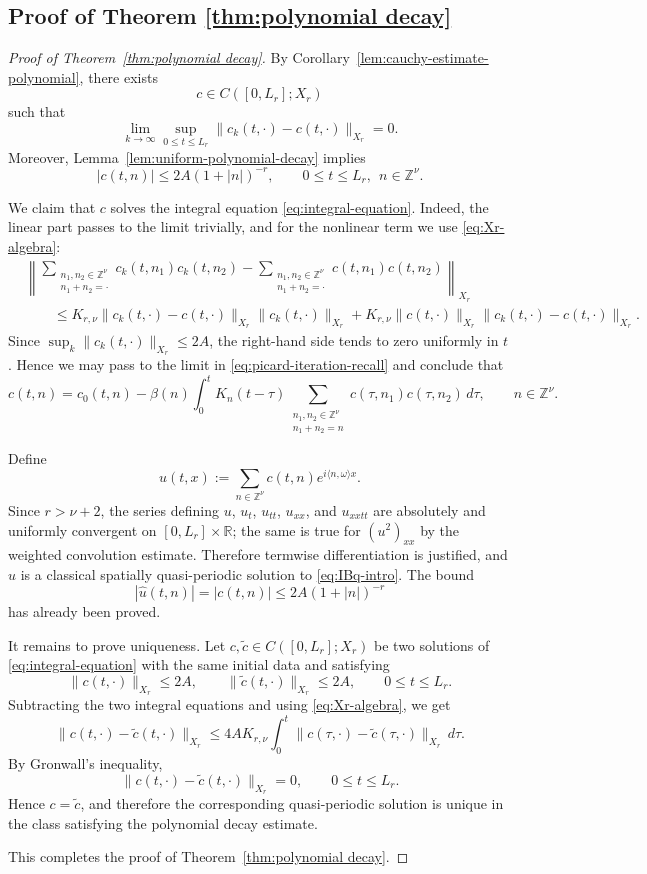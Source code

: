 \documentclass[12pt,reqno,tbtags]{amsart}
\newcommand\1{\mathbbm{1}}
\begin{document}
\subsection{Proof of Theorem \ref{thm:polynomial decay}}

\begin{proof}[Proof of Theorem~\ref{thm:polynomial decay}]
By Corollary~\ref{lem:cauchy-estimate-polynomial}, there exists
\[
c\in C([0,L_r];X_r)
\]
such that
\[
\lim_{k\to\infty}\sup_{0\le t\le L_r}\|c_k(t,\cdot)-c(t,\cdot)\|_{X_r}=0.
\]
Moreover, Lemma~\ref{lem:uniform-polynomial-decay} implies
\[
|c(t,n)|\le 2A(1+|n|)^{-r},
\qquad
0\le t\le L_r,\ \ n\in\mathbb Z^\nu.
\]

We claim that $c$ solves the integral equation \eqref{eq:integral-equation}. Indeed,
the linear part passes to the limit trivially, and for the nonlinear term we use
\eqref{eq:Xr-algebra}:
\begin{align*}
&\left\|
\sum_{\substack{n_1,n_2\in\mathbb Z^\nu\\ n_1+n_2=\cdot}}
c_k(t,n_1)c_k(t,n_2)
-
\sum_{\substack{n_1,n_2\in\mathbb Z^\nu\\ n_1+n_2=\cdot}}
c(t,n_1)c(t,n_2)
\right\|_{X_r} \\
&\qquad\le
K_{r,\nu}\|c_k(t,\cdot)-c(t,\cdot)\|_{X_r}\|c_k(t,\cdot)\|_{X_r}
+
K_{r,\nu}\|c(t,\cdot)\|_{X_r}\|c_k(t,\cdot)-c(t,\cdot)\|_{X_r}.
\end{align*}
Since $\sup_k\|c_k(t,\cdot)\|_{X_r}\le 2A$, the right-hand side tends to zero
uniformly in $t$. Hence we may pass to the limit in \eqref{eq:picard-iteration-recall}
and conclude that
\[
c(t,n)
=
c_0(t,n)
-\beta(n)\int_0^t K_n(t-\tau)
\sum_{\substack{n_1,n_2\in\mathbb Z^\nu\\ n_1+n_2=n}}
c(\tau,n_1)c(\tau,n_2)\,d\tau,
\qquad n\in\mathbb Z^\nu.
\]

Define
\[
u(t,x):=\sum_{n\in\mathbb Z^\nu}c(t,n)e^{i\langle n,\omega\rangle x}.
\]
Since $r>\nu+2$, the series defining $u$, $u_t$, $u_{tt}$, $u_{xx}$, and $u_{xxtt}$
are absolutely and uniformly convergent on $[0,L_r]\times\mathbb R$; the same is true
for $(u^2)_{xx}$ by the weighted convolution estimate. Therefore termwise
differentiation is justified, and $u$ is a classical spatially quasi-periodic solution
to \eqref{eq:IBq-intro}. The bound
\[
|\widehat u(t,n)|=|c(t,n)|\le 2A(1+|n|)^{-r}
\]
has already been proved.

It remains to prove uniqueness. Let $c,\widetilde c\in C([0,L_r];X_r)$ be two
solutions of \eqref{eq:integral-equation} with the same initial data and satisfying
\[
\|c(t,\cdot)\|_{X_r}\le 2A,
\qquad
\|\widetilde c(t,\cdot)\|_{X_r}\le 2A,
\qquad 0\le t\le L_r.
\]
Subtracting the two integral equations and using \eqref{eq:Xr-algebra}, we get
\[
\|c(t,\cdot)-\widetilde c(t,\cdot)\|_{X_r}
\le
4AK_{r,\nu}\int_0^t
\|c(\tau,\cdot)-\widetilde c(\tau,\cdot)\|_{X_r}\,d\tau.
\]
By Gronwall's inequality,
\[
\|c(t,\cdot)-\widetilde c(t,\cdot)\|_{X_r}=0,
\qquad 0\le t\le L_r.
\]
Hence $c=\widetilde c$, and therefore the corresponding quasi-periodic solution is
unique in the class satisfying the polynomial decay estimate.

This completes the proof of Theorem~\ref{thm:polynomial decay}.
\end{proof}
\end{document}
